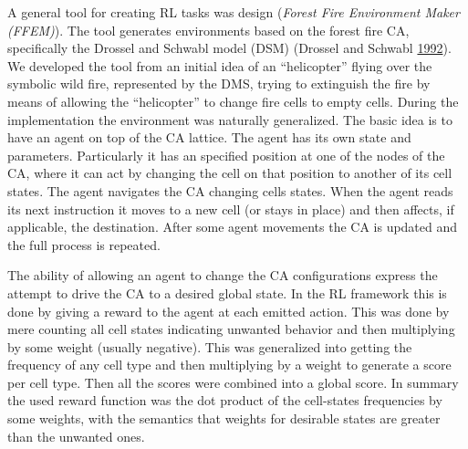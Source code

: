 \documentclass[
  openany]{book}
\begin{document}
A general tool for creating RL tasks was design (\emph{Forest Fire Environment Maker (FFEM)}). The tool generates environments based on the forest fire CA, specifically the Drossel and Schwabl model (DSM) (Drossel and Schwabl \protect\hyperlink{ref-drossel1992self}{1992}). We developed the tool from an initial idea of an ``helicopter'' flying over the symbolic wild fire, represented by the DMS, trying to extinguish the fire by means of allowing the ``helicopter'' to change fire cells to empty cells. During the implementation the environment was naturally generalized. The basic idea is to have an agent on top of the CA lattice. The agent has its own state and parameters. Particularly it has an specified position at one of the nodes of the CA, where it can act by changing the cell on that position to another of its cell states. The agent navigates the CA changing cells states. When the agent reads its next instruction it moves to a new cell (or stays in place) and then affects, if applicable, the destination. After some agent movements the CA is updated and the full process is repeated.

The ability of allowing an agent to change the CA configurations express the attempt to drive the CA to a desired global state. In the RL framework this is done by giving a reward to the agent at each emitted action. This was done by mere counting all cell states indicating unwanted behavior and then multiplying by some weight (usually negative). This was generalized into getting the frequency of any cell type and then multiplying by a weight to generate a score per cell type. Then all the scores were combined into a global score. In summary the used reward function was the dot product of the cell-states frequencies by some weights, with the semantics that weights for desirable states are greater than the unwanted ones.
\end{document}
